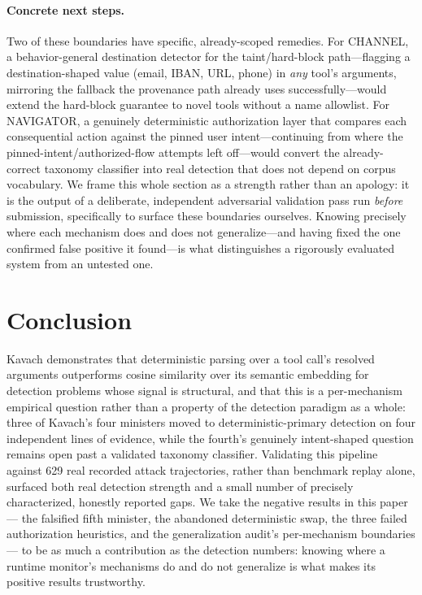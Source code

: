 \documentclass[sigconf,anonymous,review]{acmart}
\begin{document}
\paragraph{Concrete next steps.} Two of these boundaries have specific,
already-scoped remedies. For CHANNEL, a behavior-general destination detector for
the taint/hard-block path---flagging a destination-shaped value (email, IBAN,
URL, phone) in \emph{any} tool's arguments, mirroring the fallback the provenance
path already uses successfully---would extend the hard-block guarantee to novel
tools without a name allowlist. For NAVIGATOR, a genuinely deterministic
authorization layer that compares each consequential action against the pinned
user intent---continuing from where the pinned-intent/authorized-flow attempts
left off---would convert the already-correct taxonomy classifier into real
detection that does not depend on corpus vocabulary. We frame this whole section
as a strength rather than an apology: it is the output of a deliberate,
independent adversarial validation pass run \emph{before} submission,
specifically to surface these boundaries ourselves. Knowing precisely where each
mechanism does and does not generalize---and having fixed the one confirmed
false positive it found---is what distinguishes a rigorously evaluated system
from an untested one.

\section{Conclusion}
\label{sec:conclusion}
Kavach demonstrates that deterministic parsing over a tool call's resolved
arguments outperforms cosine similarity over its semantic embedding for
detection problems whose signal is structural, and that this is a
per-mechanism empirical question rather than a property of the detection
paradigm as a whole: three of Kavach's four ministers moved to
deterministic-primary detection on four independent lines of evidence, while
the fourth's genuinely intent-shaped question remains open past a validated
taxonomy classifier. Validating this pipeline against 629 real recorded
attack trajectories, rather than benchmark replay alone, surfaced both real
detection strength and a small number of precisely characterized, honestly
reported gaps. We take the negative results in this paper --- the falsified
fifth minister, the abandoned deterministic swap, the three failed
authorization heuristics, and the generalization audit's per-mechanism
boundaries --- to be as much a contribution as the detection numbers: knowing
where a runtime monitor's mechanisms do and do not generalize is what makes
its positive results trustworthy.
\end{document}
